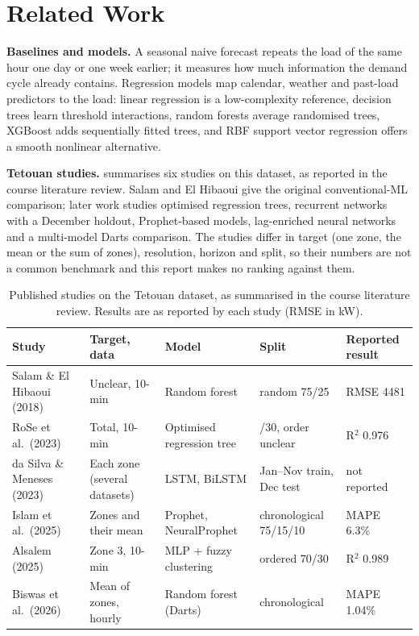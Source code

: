 \section{Related Work}\label{sec:related}
\textbf{Baselines and models.} A seasonal naive forecast repeats the load of the same hour one day or one week earlier; it measures how much information the demand cycle already contains. Regression models map calendar, weather and past-load predictors to the load: linear regression is a low-complexity reference, decision trees learn threshold interactions, random forests average randomised trees, XGBoost adds sequentially fitted trees\cite{chen2016}, and RBF support vector regression offers a smooth nonlinear alternative.

\textbf{Tetouan studies.}  summarises six studies on this dataset, as reported in the course literature review. Salam and El Hibaoui\cite{salam2018} give the original conventional-ML comparison; later work studies optimised regression trees\cite{rose2023}, recurrent networks with a December holdout\cite{silva2023}, Prophet-based models\cite{islam2025}, lag-enriched neural networks\cite{alsalem2025} and a multi-model Darts comparison\cite{biswas2026}. The studies differ in target (one zone, the mean or the sum of zones), resolution, horizon and split, so their numbers are not a common benchmark and this report makes no ranking against them.

\begin{table}[H]\centering\small
\caption{Published studies on the Tetouan dataset, as summarised in the course literature review. Results are as reported by each study (RMSE in kW).}\label{tab:literature}
\setlength{\tabcolsep}{5pt}
\begin{tabularx}{\linewidth}{@{}>{\raggedright\arraybackslash}p{.22\linewidth}>{\raggedright\arraybackslash}X>{\raggedright\arraybackslash}X>{\raggedright\arraybackslash}X>{\raggedright\arraybackslash}p{.17\linewidth}@{}}
\toprule
Study & Target, data & Model & Split & Reported result \\
\midrule
Salam \& El Hibaoui (2018)\cite{salam2018} & Unclear, 10-min & Random forest & random 75/25 & RMSE \num{4481} \\
RoSe et al.\ (2023)\cite{rose2023} & Total, 10-min & Optimised regression tree & 70/30, order unclear & R$^2$ 0.976 \\
da Silva \& Meneses (2023)\cite{silva2023} & Each zone (several datasets) & LSTM, BiLSTM & Jan--Nov train, Dec test & not reported \\
Islam et al.\ (2025)\cite{islam2025} & Zones and their mean & Prophet, NeuralProphet & chronological 75/15/10 & MAPE 6.3\% \\
Alsalem (2025)\cite{alsalem2025} & Zone 3, 10-min & MLP + fuzzy clustering & ordered 70/30 & R$^2$ 0.989 \\
Biswas et al.\ (2026)\cite{biswas2026} & Mean of zones, hourly & Random forest (Darts) & chronological & MAPE 1.04\% \\
\bottomrule
\end{tabularx}
\end{table}

